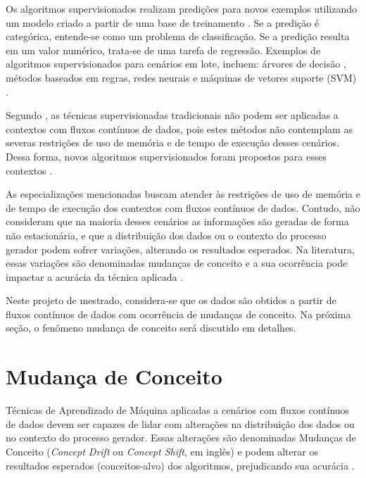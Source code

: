 \documentclass[msc, classic, a4paper]{ufbathesis}
\begin{document}
Os algoritmos supervisionados realizam predições para novos exemplos utilizando um modelo criado a partir de uma base de treinamento \cite{Kotsiantis:2007:SML:1566770.1566773}.
Se a predição é categórica, entende-se como um problema de classificação.
Se a predição resulta em um valor numérico, trata-se de uma tarefa de regressão.
Exemplos de algoritmos supervisionados para cenários em lote, incluem:
árvores de decisão \cite{Breiman:Classification_Regression_Trees},
métodos baseados em regras,
redes neurais e máquinas de vetores suporte (SVM) \cite{Vapnik1998}.

Segundo ,
as técnicas supervisionadas tradicionais não podem ser aplicadas a contextos com fluxos contínuos de dados,
pois estes métodos não contemplam as severas restrições de uso de memória e de tempo de execução desses cenários.
%
Dessa forma,
novos algoritmos supervisionados foram propostos para esses contextos \cite{Domingos:2000:MHD:347090.347107, Bifet:2013:EDS:2480362.2480516, Wang:2003:MCD:956750.956778, Aggarwal:2004:DCD:1014052.1014110, Gama:2003:ADT:956750.956813}.

As especializações mencionadas buscam atender às restrições de uso de memória e de tempo de execução dos contextos com fluxos contínuos de dados.
Contudo, não consideram que na maioria desses cenários as informações são geradas de forma não estacionária, e que a distribuição dos dados ou o contexto do processo gerador podem sofrer variações, alterando os resultados esperados.
Na literatura, essas variações são denominadas mudanças de conceito e a sua ocorrência pode impactar a acurácia da técnica aplicada \cite{Gama:2010:KDD:1855075}.

Neste projeto de mestrado, considera-se que os dados são obtidos a partir de fluxos contínuos de dados com ocorrência de mudanças de conceito.
Na próxima seção, o fenômeno mudança de conceito será discutido em detalhes.

\section{Mudança de Conceito}
\label{sec:mudanca_de_conceito}

Técnicas de Aprendizado de Máquina aplicadas a cenários com fluxos contínuos de dados devem ser capazes de lidar com alterações na distribuição dos dados ou no contexto do processo gerador.
Essas alterações são denominadas Mudanças de Conceito (\textit{Concept Drift} ou \textit{Concept Shift}, em inglês) e podem alterar os resultados esperados (conceitos-alvo) dos algoritmos, prejudicando sua acurácia \cite{Widmer:1996:LPC:226791.226798}.
\end{document}
